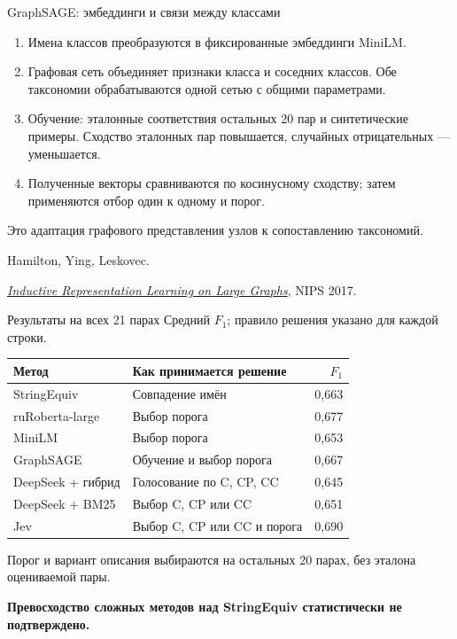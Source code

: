 \documentclass[aspectratio=169,11pt]{beamer}
\begin{document}
\renewcommand{\hseheadertext}{Часть I. Сопоставление таксономий}
\begin{frame}{GraphSAGE: эмбеддинги и связи между классами}
  \begin{enumerate}
    \item Имена классов преобразуются в фиксированные эмбеддинги MiniLM.
    \item Графовая сеть объединяет признаки класса и соседних классов.
      Обе таксономии обрабатываются одной сетью с общими параметрами.
    \item Обучение: эталонные соответствия остальных 20 пар и синтетические
      примеры. Сходство эталонных пар повышается, случайных отрицательных — уменьшается.
    \item Полученные векторы сравниваются по косинусному сходству;
      затем применяются отбор один к одному и порог.
  \end{enumerate}
  Это адаптация графового представления узлов к сопоставлению таксономий.
  \medskip

  {\fontsize{9}{11}\selectfont
    Hamilton, Ying, Leskovec.\par
    \href{https://papers.nips.cc/paper_files/paper/2017/hash/5dd9db5e033da9c6fb5ba83c7a7ebea9-Abstract.html}{\textit{Inductive Representation Learning on Large Graphs}}, NIPS 2017.}
\end{frame}

\renewcommand{\hseheadertext}{Часть I. Сопоставление таксономий}
\begin{frame}{Результаты на всех 21 парах}
  Средний $F_1$; правило решения указано для каждой строки.
  \par\smallskip
  \begin{tabular}{@{}p{}p{}r@{}}
    \toprule
    Метод & Как принимается решение & $F_1$ \\
    \midrule
    StringEquiv & Совпадение имён & 0{,}663 \\
    ruRoberta-large & Выбор порога & 0{,}677 \\
    MiniLM & Выбор порога & 0{,}653 \\
    GraphSAGE & Обучение и выбор порога & 0{,}667 \\
    DeepSeek + гибрид & Голосование по C, CP, CC & 0{,}645 \\
    DeepSeek + BM25 & Выбор C, CP или CC & 0{,}651 \\
    Jev & Выбор C, CP или CC и порога & 0{,}690 \\
    \bottomrule
  \end{tabular}
  \par\smallskip
  Порог и вариант описания выбираются на остальных 20 парах,
  без эталона оцениваемой пары.
  \par\smallskip

  \textbf{Превосходство сложных методов над StringEquiv
  статистически не подтверждено.}
\end{frame}
\end{document}
